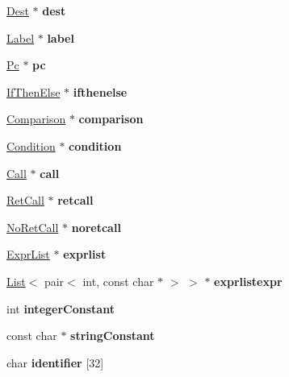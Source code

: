 \begin{DoxyCompactItemize}
\hyperlink{class_dest}{Dest} $\ast$ {\bfseries dest}
\item 
\mbox{\label{union_y_y_s_t_y_p_e_afce9225b98aaf1d901a86c2d12600078}} 
\hyperlink{class_label}{Label} $\ast$ {\bfseries label}
\item 
\mbox{\label{union_y_y_s_t_y_p_e_a9949f8f33f030c0eb8beb14877f786cb}} 
\hyperlink{class_pc}{Pc} $\ast$ {\bfseries pc}
\item 
\mbox{\label{union_y_y_s_t_y_p_e_ac422df1bcfb8f9687fc229612fd64a6f}} 
\hyperlink{class_if_then_else}{If\+Then\+Else} $\ast$ {\bfseries ifthenelse}
\item 
\mbox{\label{union_y_y_s_t_y_p_e_aff92592aa6f4e4c91433b3da69397a15}} 
\hyperlink{class_comparison}{Comparison} $\ast$ {\bfseries comparison}
\item 
\mbox{\label{union_y_y_s_t_y_p_e_a11a838def6e1a21823b677938c5f2ffd}} 
\hyperlink{class_condition}{Condition} $\ast$ {\bfseries condition}
\item 
\mbox{\label{union_y_y_s_t_y_p_e_a3f95b4b4410f0497fe5317601d6f3088}} 
\hyperlink{class_call}{Call} $\ast$ {\bfseries call}
\item 
\mbox{\label{union_y_y_s_t_y_p_e_acccaa142365ea6a5ea9082f95141080f}} 
\hyperlink{class_ret_call}{Ret\+Call} $\ast$ {\bfseries retcall}
\item 
\mbox{\label{union_y_y_s_t_y_p_e_a350f41d1e879dba46e28ac835a359afa}} 
\hyperlink{class_no_ret_call}{No\+Ret\+Call} $\ast$ {\bfseries noretcall}
\item 
\mbox{\label{union_y_y_s_t_y_p_e_a94e2706eb0593a1c80d81f9ffd15062d}} 
\hyperlink{class_expr_list}{Expr\+List} $\ast$ {\bfseries exprlist}
\item 
\mbox{\label{union_y_y_s_t_y_p_e_a8ce9760e4dc88e016129c4c7c1babcd3}} 
\hyperlink{class_list}{List}$<$ pair$<$ int, const char $\ast$ $>$ $>$ $\ast$ {\bfseries exprlistexpr}
\item 
\mbox{\label{union_y_y_s_t_y_p_e_ad6907b9d6a2a4560feda79320d92ab1f}} 
int {\bfseries integer\+Constant}
\item 
\mbox{\label{union_y_y_s_t_y_p_e_a20bc1d505c7fb1569bb512b2d7a86be9}} 
const char $\ast$ {\bfseries string\+Constant}
\item 
\mbox{\label{union_y_y_s_t_y_p_e_a4c81e390632b640948a3f0a0fe649628}} 
char {\bfseries identifier} \mbox{[}32\mbox{]}
\end{DoxyCompactItemize}


